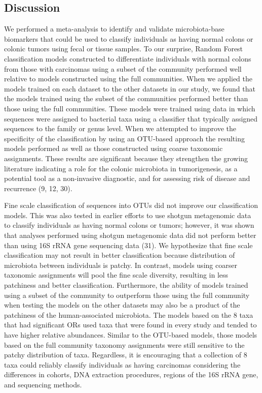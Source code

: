 \documentclass[12pt,]{article}
\begin{document}
\newpage

\subsection{Discussion}\label{discussion}

We performed a meta-analysis to identify and validate microbiota-base
biomarkers that could be used to classify individuals as having normal
colons or colonic tumors using fecal or tissue samples. To our surprise,
Random Forest classification models constructed to differentiate
individuals with normal colons from those with carcinomas using a subset
of the community performed well relative to models constructed using the
full communities. When we applied the models trained on each dataset to
the other datasets in our study, we found that the models trained using
the subset of the communities performed better than those using the full
communities. These models were trained using data in which sequences
were assigned to bacterial taxa using a classifier that typically
assigned sequences to the family or genus level. When we attempted to
improve the specificity of the classification by using an OTU-based
approach the resulting models performed as well as those constructed
using coarse taxonomic assignments. These results are significant
because they strengthen the growing literature indicating a role for the
colonic microbiota in tumorigenesis, as a potential tool as a
non-invasive diagnostic, and for assessing risk of disease and
recurrence (9, 12, 30).

Fine scale classification of sequences into OTUs did not improve our
classification models. This was also tested in earlier efforts to use
shotgun metagenomic data to classify individuals as having normal colons
or tumors; however, it was shown that analyses performed using shotgun
metagenomic data did not perform better than using 16S rRNA gene
sequencing data (31). We hypothesize that fine scale classification may
not result in better classification because distribution of microbiota
between individuals is patchy. In contrast, models using coarser
taxonomic assignments will pool the fine scale diversity, resulting in
less patchiness and better classification. Furthermore, the ability of
models trained using a subset of the community to outperform those using
the full community when testing the models on the other datasets may
also be a product of the patchiness of the human-associated microbiota.
The models based on the 8 taxa that had significant ORs used taxa that
were found in every study and tended to have higher relative abundances.
Similar to the OTU-based models, those models based on the full
community taxonomy assignments were still sensitive to the patchy
distribution of taxa. Regardless, it is encouraging that a collection of
8 taxa could reliably classify individuals as having carcinomas
considering the differences in cohorts, DNA extraction procedures,
regions of the 16S rRNA gene, and sequencing methods.
\end{document}
